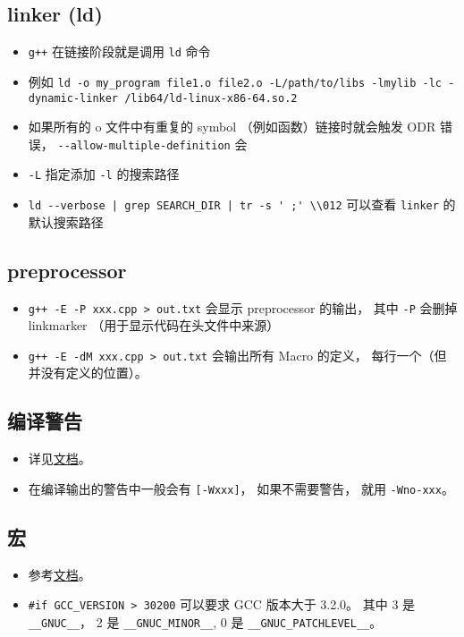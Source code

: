 \subsection{linker (ld)}
\begin{itemize}
\item \verb`g++` 在链接阶段就是调用 \verb`ld` 命令
\item 例如 \verb`ld -o my_program file1.o file2.o -L/path/to/libs -lmylib -lc -dynamic-linker /lib64/ld-linux-x86-64.so.2`
\item 如果所有的 o 文件中有重复的 symbol （例如函数）链接时就会触发 ODR 错误， \verb`--allow-multiple-definition` 会
\item \verb`-L` 指定添加 \verb`-l` 的搜索路径
\item \verb`ld --verbose | grep SEARCH_DIR | tr -s ' ;' \\012` 可以查看 \verb`linker` 的默认搜索路径
\end{itemize}

\subsection{preprocessor}
\begin{itemize}
\item \verb`g++ -E -P xxx.cpp > out.txt` 会显示 preprocessor 的输出， 其中 \verb`-P` 会删掉 linkmarker （用于显示代码在头文件中来源）
\item \verb`g++ -E -dM xxx.cpp > out.txt` 会输出所有 Macro 的定义， 每行一个（但并没有定义的位置）。
\end{itemize}

\subsection{编译警告}
\begin{itemize}
\item 详见\href{https://gcc.gnu.org/onlinedocs/gcc/Warning-Options.html}{文档}。
\item 在编译输出的警告中一般会有 \verb`[-Wxxx]`， 如果不需要警告， 就用 \verb`-Wno-xxx`。
\end{itemize}

\subsection{宏}
\begin{itemize}
\item 参考\href{https://gcc.gnu.org/onlinedocs/cpp/Common-Predefined-Macros.html}{文档}。
\item \verb`#if GCC_VERSION > 30200` 可以要求 GCC 版本大于 3.2.0。 其中 3 是 \verb`__GNUC__`， 2 是 \verb`__GNUC_MINOR__`,  0 是 \verb`__GNUC_PATCHLEVEL__`。
\end{itemize}

